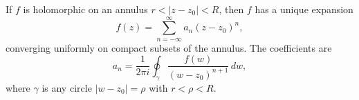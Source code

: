 If $f$ is holomorphic on an annulus $r < |z - z_0| < R$, then $f$ has a unique expansion
$$f(z) = \sum_{n=-\infty}^{\infty} a_n (z - z_0)^n,$$
converging uniformly on compact subsets of the annulus. The coefficients are
$$a_n = \frac{1}{2\pi i} \oint_\gamma \frac{f(w)}{(w - z_0)^{n+1}} \, dw,$$
where $\gamma$ is any circle $|w - z_0| = \rho$ with $r < \rho < R$.

